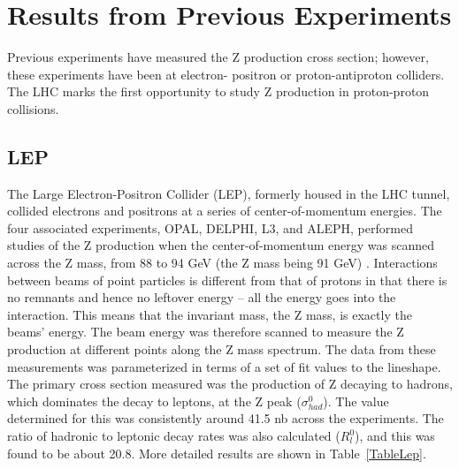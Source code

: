 \section{Results from Previous Experiments}
\label{theory:prev}

Previous experiments have measured the 
Z production cross section; 
however, these experiments have been at electron-
positron or proton-antiproton colliders.  
The LHC marks the first opportunity to study 
Z production in proton-proton collisions.  %

\subsection{LEP}
\label{theory:lep}
The Large Electron-Positron Collider (LEP), 
formerly housed in the LHC tunnel, 
collided electrons and positrons at a 
series of center-of-momentum energies.  
The four associated experiments, 
OPAL, DELPHI, L3, and ALEPH, performed studies of 
the Z production 
when the center-of-momentum energy 
was scanned across the Z mass, 
from 88 to 94 GeV (the Z mass being %
91 GeV)
\cite{Z-PoleLep}.  
Interactions between beams of point particles 
is different from that of protons in that there is no 
remnants and hence no leftover energy -- 
all the energy goes into the interaction.  
This means that the invariant mass, 
the Z mass, is exactly the beams' energy.  
The beam energy was therefore scanned 
to measure the Z production at different 
points along the Z mass spectrum.  
The data from these measurements was parameterized 
in terms of a set of fit values to the lineshape.  
The primary cross section measured was the production 
of Z decaying to hadrons, which dominates the decay 
to leptons, at the Z peak ($\sigma_{had}^0$).  
The value determined for this was consistently 
around 41.5 nb across the experiments.  
The ratio of hadronic to leptonic decay rates 
was also calculated ($R_l^0$), 
and this was found to be about 20.8.  
More detailed results 
are shown in Table~\ref{TableLep}.  


